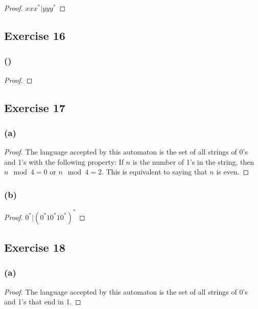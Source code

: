 \documentclass[14pt]{extarticle}
\begin{document}
\begin{proof}
\(xxx^* | yyy^*\)
\end{proof}

\subsection{Exercise 16}

\subsubsection{()}

\begin{proof}

\end{proof}

\subsection{Exercise 17}

\subsubsection{(a)}

\begin{proof}
The language accepted by this automaton is the set of all strings of 0’s and 1’s with the following property: If \(n\) 
is the number of 1’s in the string, then \(n \mod 4 = 0\) or \(n \mod 4 = 2\). 
This is equivalent to saying that \(n\) is even.
\end{proof}

\subsubsection{(b)}

\begin{proof}
\(0^* | (0^*10^*10^*)^*\)
\end{proof}

\subsection{Exercise 18}

\subsubsection{(a)}

\begin{proof}
The language accepted by this automaton is the set of all strings of 0’s and 1’s that end in 1.
\end{proof}
\end{document}
